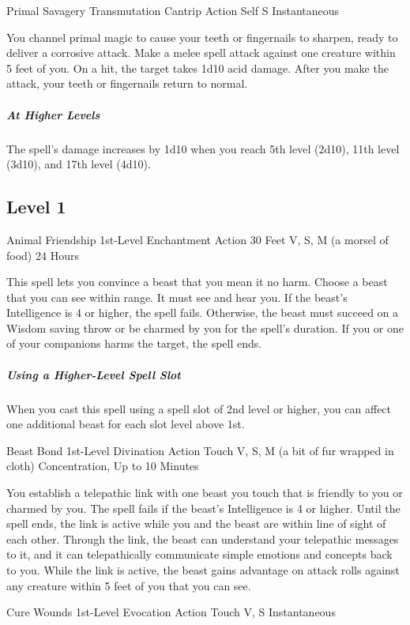 \documentclass[letterpaper,openany,oneside,twocolumn]{book}
\begin{document}
\DndSpellHeader
  {Primal Savagery}
  {Transmutation Cantrip}
  {Action}
  {Self}
  {S}
  {Instantaneous}

You channel primal magic to cause your teeth or fingernails to sharpen, ready to deliver a corrosive attack. Make a melee spell attack against one creature within 5 feet of you. On a hit, the target takes 1d10 acid damage. After you make the attack, your teeth or fingernails return to normal.

\subparagraph*{At Higher Levels} The spell's damage increases by 1d10 when you reach 5th level (2d10), 11th level (3d10), and 17th level (4d10).

\subsection*{Level 1}

\DndSpellHeader
  {Animal Friendship}
  {1st-Level Enchantment}
  {Action}
  {30 Feet}
  {V, S, M (a morsel of food)}
  {24 Hours}

This spell lets you convince a beast that you mean it no harm. Choose a beast that you can see within range. It must see and hear you. If the beast's Intelligence is 4 or higher, the spell fails. Otherwise, the beast must succeed on a Wisdom saving throw or be charmed by you for the spell's duration. If you or one of your companions harms the target, the spell ends.

\subparagraph*{Using a Higher-Level Spell Slot} When you cast this spell using a spell slot of 2nd level or higher, you can affect one additional beast for each slot level above 1st.

\DndSpellHeader
  {Beast Bond}
  {1st-Level Divination}
  {Action}
  {Touch}
  {V, S, M (a bit of fur wrapped in cloth)}
  {Concentration, Up to 10 Minutes}

You establish a telepathic link with one beast you touch that is friendly to you or charmed by you. The spell fails if the beast's Intelligence is 4 or higher. Until the spell ends, the link is active while you and the beast are within line of sight of each other. Through the link, the beast can understand your telepathic messages to it, and it can telepathically communicate simple emotions and concepts back to you. While the link is active, the beast gains advantage on attack rolls against any creature within 5 feet of you that you can see.

\DndSpellHeader
  {Cure Wounds}
  {1st-Level Evocation}
  {Action}
  {Touch}
  {V, S}
  {Instantaneous}
\end{document}
